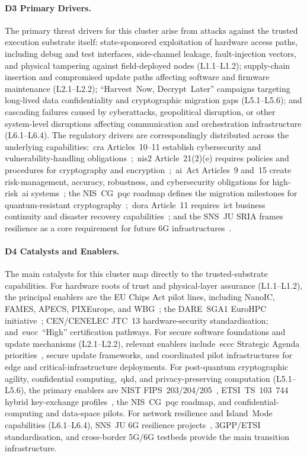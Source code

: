 \documentclass{ieeeaccess}
\begin{document}
\paragraph{D3 Primary Drivers.}
The primary threat drivers for this cluster arise from attacks against the trusted execution substrate itself: state-sponsored exploitation of hardware access paths, including debug and test interfaces, side-channel leakage, fault-injection vectors, and physical tampering against field-deployed nodes (L1.1--L1.2); supply-chain insertion and compromised update paths affecting software and firmware maintenance (L2.1--L2.2); ``Harvest~Now, Decrypt~Later'' campaigns targeting long-lived data confidentiality and cryptographic migration gaps (L5.1--L5.6); and cascading failures caused by cyberattacks, geopolitical disruption, or other system-level disruptions affecting communication and orchestration infrastructure (L6.1--L6.4). The regulatory drivers are correspondingly distributed across the underlying capabilities:~\gls{cra} Articles~10--11 establish cybersecurity and vulnerability-handling obligations~\cite{eucra2024};~\gls{nis2} Article~21(2)(e) requires policies and procedures for cryptography and encryption~\cite{eunis2};~\gls{ai}~Act Articles~9 and~15 create risk-management, accuracy, robustness, and cybersecurity obligations for high-risk~\gls{ai} systems~\cite{euaiact}; the NIS~CG~\gls{pqc} roadmap defines the migration milestones for quantum-resistant cryptography~\cite{niscg2025pqc};~\gls{dora} Article~11 requires~\gls{ict} business continuity and disaster recovery capabilities~\cite{eudora}; and the SNS~JU SRIA frames resilience as a core requirement for future 6G infrastructures~\cite{snsju2023}.

\paragraph{D4 Catalysts and Enablers.}
The main catalysts for this cluster map directly to the trusted-substrate capabilities. For hardware roots of trust and physical-layer assurance (L1.1--L1.2), the principal enablers are the EU Chips Act pilot lines, including NanoIC, FAMES, APECS, PIXEurope, and WBG~\cite{euchipsact}; the DARE~SGA1 EuroHPC initiative~\cite{eurohpcdare2025}; CEN/CENELEC JTC~13 hardware-security standardisation; and~\gls{eucc}~``High'' certification pathways. For secure software foundations and update mechanisms (L2.1--L2.2), relevant enablers include~\gls{eccc} Strategic Agenda priorities~\cite{eccc2024}, secure update frameworks, and coordinated pilot infrastructures for edge and critical-infrastructure deployments. For post-quantum cryptographic agility, confidential computing,~\gls{qkd}, and privacy-preserving computation (L5.1--L5.6), the primary enablers are NIST FIPS~203/204/205~\cite{nistfips203,nistfips204,nistfips205}, ETSI~TS~103~744 hybrid key-exchange profiles~\cite{etsiqshybrid}, the NIS~CG~\gls{pqc} roadmap, and confidential-computing and data-space pilots. For network resilience and Island~Mode capabilities (L6.1--L6.4), SNS~JU 6G resilience projects~\cite{snsju2023}, 3GPP/ETSI standardisation, and cross-border 5G/6G testbeds provide the main transition infrastructure.
\end{document}
